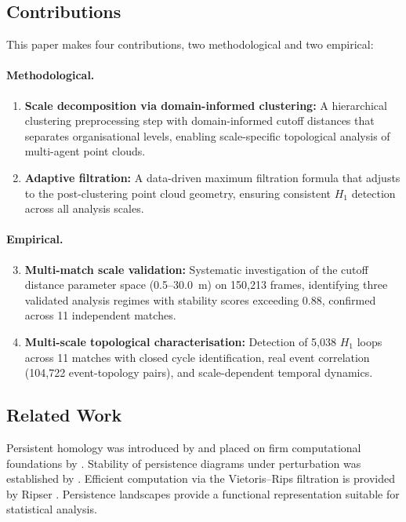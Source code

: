 \subsection{Contributions}

This paper makes four contributions, two methodological and two empirical:

\paragraph{Methodological.}
\begin{enumerate}
  \item \textbf{Scale decomposition via domain-informed clustering:} A hierarchical clustering preprocessing step with domain-informed cutoff distances that separates organisational levels, enabling scale-specific topological analysis of multi-agent point clouds.
  \item \textbf{Adaptive filtration:} A data-driven maximum filtration formula that adjusts to the post-clustering point cloud geometry, ensuring consistent \(H_1\) detection across all analysis scales.
\end{enumerate}

\paragraph{Empirical.}
\begin{enumerate}
  \setcounter{enumi}{2}
  \item \textbf{Multi-match scale validation:} Systematic investigation of the cutoff distance parameter space (0.5--30.0~m) on 150,213 frames, identifying three validated analysis regimes with stability scores exceeding 0.88, confirmed across 11 independent matches.
  \item \textbf{Multi-scale topological characterisation:} Detection of 5,038 \(H_1\) loops across 11 matches with closed cycle identification, real event correlation (104,722 event-topology pairs), and scale-dependent temporal dynamics.
\end{enumerate}

\subsection{Related Work}

Persistent homology was introduced by \citet{Edelsbrunner2000} and placed on firm computational foundations by \citet{Zomorodian2005}. Stability of persistence diagrams under perturbation was established by \citet{CohenSteiner2007}. Efficient computation via the Vietoris--Rips filtration is provided by Ripser \citep{Bauer2021}. Persistence landscapes \citep{Bubenik2015} provide a functional representation suitable for statistical analysis.

